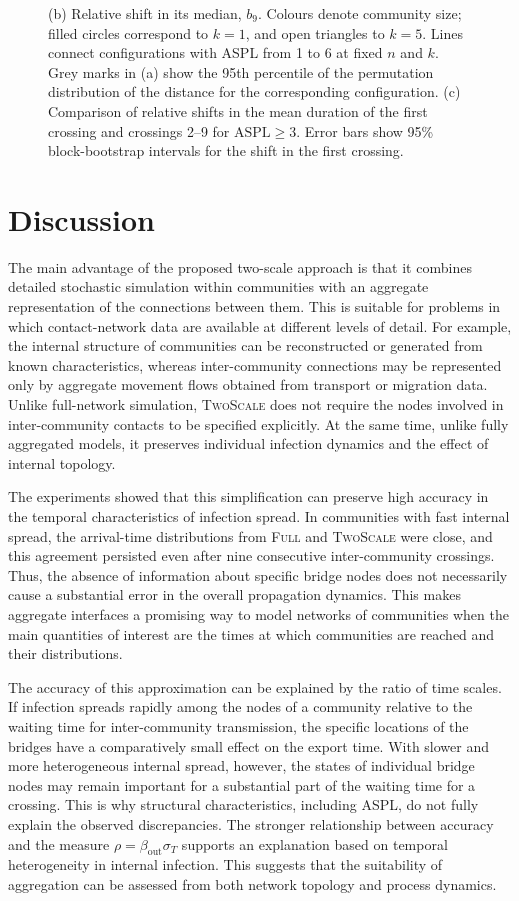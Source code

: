 \documentclass[a4paper,fleqn]{cas-sc}
\newcommand{\Full}{\textup{\textsc{Full}}}
\newcommand{\TS}{\textup{\textsc{TwoScale}}}
\begin{document}
\begin{figure}[tbp]
{(b) Relative shift in its median, $b_9$.
Colours denote community size; filled circles correspond to $k=1$, and open triangles to $k=5$.
Lines connect configurations with ASPL from 1 to 6 at fixed $n$ and $k$. Grey marks in (a) show the 95th percentile of the permutation distribution of the distance for the corresponding configuration.
(c) Comparison of relative shifts in the mean duration of the first crossing and crossings 2--9 for $\mathrm{ASPL}\geq3$.
Error bars show 95\% block-bootstrap intervals for the shift in the first crossing.
}
\label{fig:descriptor}
\end{figure}


\section{Discussion}
\label{sec:discussion}

The main advantage of the proposed two-scale approach is that it combines detailed stochastic simulation within communities with an aggregate representation of the connections between them. This is suitable for problems in which contact-network data are available at different levels of detail. For example, the internal structure of communities can be reconstructed or generated from known characteristics, whereas inter-community connections may be represented only by aggregate movement flows obtained from transport or migration data. Unlike full-network simulation, \TS{} does not require the nodes involved in inter-community contacts to be specified explicitly. At the same time, unlike fully aggregated models, it preserves individual infection dynamics and the effect of internal topology.

The experiments showed that this simplification can preserve high accuracy in the temporal characteristics of infection spread. In communities with fast internal spread, the arrival-time distributions from \Full{} and \TS{} were close, and this agreement persisted even after nine consecutive inter-community crossings. Thus, the absence of information about specific bridge nodes does not necessarily cause a substantial error in the overall propagation dynamics. This makes aggregate interfaces a promising way to model networks of communities when the main quantities of interest are the times at which communities are reached and their distributions.

The accuracy of this approximation can be explained by the ratio of time scales. If infection spreads rapidly among the nodes of a community relative to the waiting time for inter-community transmission, the specific locations of the bridges have a comparatively small effect on the export time. With slower and more heterogeneous internal spread, however, the states of individual bridge nodes may remain important for a substantial part of the waiting time for a crossing. This is why structural characteristics, including ASPL, do not fully explain the observed discrepancies. The stronger relationship between accuracy and the measure $\rho=\beta_{\mathrm{out}}\sigma_T$ supports an explanation based on temporal heterogeneity in internal infection. This suggests that the suitability of aggregation can be assessed from both network topology and process dynamics.
\end{document}
